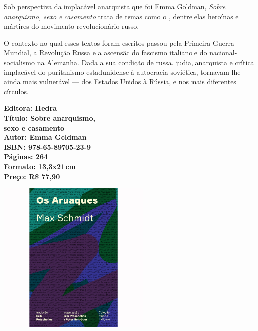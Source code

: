 \noindent{}Sob perspectiva da implacável anarquista que foi Emma Goldman, \textit{Sobre anarquismo, sexo e casamento} trata de temas como o , dentre elas heroínas e mártires do movimento revolucionário russo. 

O contexto no qual esses textos foram escritos passou pela Primeira Guerra Mundial, a Revolução Russa e a ascensão do fascismo italiano e do nacional-socialismo na Alemanha. Dada a sua condição de russa, judia, anarquista e crítica implacável do puritanismo estadunidense à autocracia soviética, tornavam-lhe ainda mais vulnerável --- dos Estados Unidos à Rússia, e nos mais diferentes círculos.

\vfill
\noindent\begin{minipage}[c]{.5\linewidth}
{\small\textbf{
\hspace*{-.1cm}Editora: Hedra\\
Título: Sobre anarquismo,\\sexo e casamento\\
Autor: Emma Goldman\\ 
ISBN: 978-65-89705-23-9\\
Páginas: 264\\
Formato: 13,3x21\,cm\\
Preço: R\$ 77,90\\
}}
\end{minipage}
\pagebreak

\begin{center}
\hspace*{.5cm}\includegraphics[width=74mm]{./CAPAS/HEDRA_ARUAQUES.jpg}
\end{center}
\hspace*{-7cm}\hrulefill\hspace*{-7cm}
\medskip


